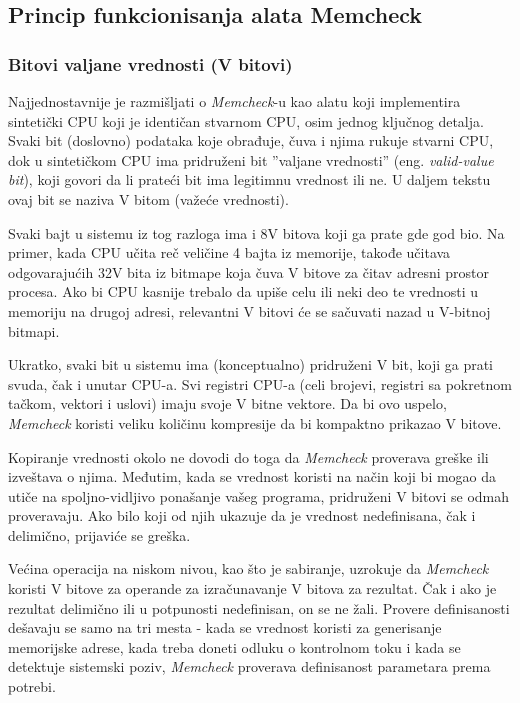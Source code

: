 \documentclass[12pt,oneside]{memoir}
\theoremstyle{plain}
\theoremstyle{definition}
\begin{document}
\subsection{Princip funkcionisanja alata Memcheck}

\subsubsection{Bitovi valjane vrednosti (V bitovi)}
Najjednostavnije je razmišljati o \textit{Memcheck}-u kao alatu koji implementira sintetički CPU koji je identičan stvarnom CPU, osim jednog ključnog detalja. Svaki bit (doslovno) podataka koje obrađuje, čuva i njima rukuje stvarni CPU, dok u sintetičkom CPU ima pridruženi bit ''valjane vrednosti'' (eng. \textit{valid-value bit}), koji govori da li prateći bit ima legitimnu vrednost ili ne. U daljem tekstu ovaj bit se naziva V bitom (važeće vrednosti).

Svaki bajt u sistemu iz tog razloga ima i 8V bitova koji ga prate gde god bio. Na primer, kada CPU učita reč veličine 4 bajta iz memorije, takođe učitava odgovarajućih 32V bita iz bitmape koja čuva V bitove za čitav adresni prostor procesa. Ako bi CPU kasnije trebalo da upiše celu ili neki deo te vrednosti u memoriju na drugoj adresi, relevantni V bitovi će se sačuvati nazad u V-bitnoj bitmapi.

Ukratko, svaki bit u sistemu ima (konceptualno) pridruženi V bit, koji ga prati svuda, čak i unutar CPU-a. Svi registri CPU-a (celi brojevi, registri sa pokretnom tačkom, vektori i uslovi) imaju svoje V bitne vektore. Da bi ovo uspelo, \textit{Memcheck} koristi veliku količinu kompresije da bi kompaktno prikazao V bitove.

Kopiranje vrednosti okolo ne dovodi do toga da \textit{Memcheck} proverava greške ili izveštava o njima. Međutim, kada se vrednost koristi na način koji bi mogao da utiče na spoljno-vidljivo ponašanje vašeg programa, pridruženi V bitovi se odmah proveravaju. Ako bilo koji od njih ukazuje da je vrednost nedefinisana, čak i delimično, prijaviće se greška.

Većina operacija na niskom nivou, kao što je sabiranje, uzrokuje da \textit{Memcheck} koristi V bitove za operande za izračunavanje V bitova za rezultat. Čak i ako je rezultat delimično ili u potpunosti nedefinisan, on se ne žali. Provere definisanosti dešavaju se samo na tri mesta -  kada se vrednost koristi za generisanje memorijske adrese, kada treba doneti odluku o kontrolnom toku i kada se detektuje sistemski poziv, \textit{Memcheck} proverava definisanost parametara prema potrebi.
\end{document}
